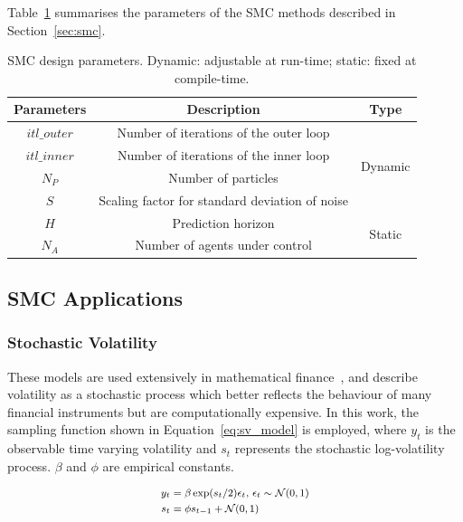 Table~\ref{tab:parameters} summarises the parameters of the SMC methods described in Section~\ref{sec:smc}.

\begin{table}
	\setlength{\tabcolsep}{3pt}
	\begin{spacing}{1.0}
	\caption{SMC design parameters. Dynamic: adjustable at run-time; static: fixed at compile-time.}
	\label{tab:parameters}
	\footnotesize
	\centering
	\smallskip
		\begin{tabular}{c|c|c}
			\hline
			 Parameters & Description & Type\\
			\hline
			\hline
			$itl\_outer$ & Number of iterations of the outer loop & \multirow{4}{*}{Dynamic}\\
			$itl\_inner$ & Number of iterations of the inner loop &\\
			$N_P$ & Number of particles &\\
			$S$ & Scaling factor for standard deviation of noise &\\
			\hline
			$H$ & Prediction horizon & \multirow{2}{*}{Static}\\
			$N_A$ & Number of agents under control &\\
			\hline
		\end{tabular}
		\end{spacing}
\end{table}


\subsection{SMC Applications}
\subsubsection{Stochastic Volatility}
\label{sec:vol}

These models are used extensively in mathematical
finance~\cite{casarin04,weng12}, and describe volatility as a
stochastic process which better reflects the behaviour of many
financial instruments but are computationally expensive. In this
work, the sampling function shown in Equation~\ref{eq:sv_model} is employed,
where $y_t$ is the observable time varying volatility and $s_t$ represents the stochastic log-volatility process.
$\beta$ and $\phi$ are empirical constants.

\begin{equation}
\footnotesize
\begin{aligned}
	y_t &= \beta \exp(s_t/2)\epsilon_t \mbox{, } \epsilon_t \sim \mathcal{N}(0,1) \\
	s_t &= \phi s_{t-1} + \mathcal{N}(0,1)
\end{aligned}
\label{eq:sv_model}
\end{equation}

